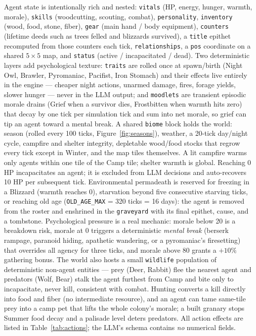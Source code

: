 \documentclass[10pt,a4paper]{article}
\begin{document}
Agent state is intentionally rich and nested: \texttt{vitals} (HP, energy, hunger, warmth, morale), \texttt{skills} (woodcutting, scouting, combat), \texttt{personality}, \texttt{inventory} (wood, food, stone, fiber), \texttt{gear} (main hand / body equipment), \texttt{counters} (lifetime deeds such as trees felled and blizzards survived), a \texttt{title} epithet recomputed from those counters each tick, \texttt{relationships}, a \texttt{pos} coordinate on a shared $5\times5$ map, and \texttt{status} (active / incapacitated / dead). Two deterministic layers add psychological texture: \texttt{traits} are rolled once at spawn/birth (Night Owl, Brawler, Pyromaniac, Pacifist, Iron Stomach) and their effects live entirely in the engine --- cheaper night actions, unarmed damage, fires, forage yields, slower hunger --- never in the LLM output; and \texttt{moodlets} are transient episodic morale drains (Grief when a survivor dies, Frostbitten when warmth hits zero) that decay by one tick per simulation tick and sum into net morale, so grief can tip an agent toward a mental break. A shared \texttt{biome} block holds the world: season (rolled every 100 ticks, Figure~\ref{fig:seasons}), weather, a 20-tick day/night cycle, campfire and shelter integrity, depletable wood/food stocks that regrow every tick except in Winter, and the map tiles themselves. A lit campfire warms only agents within one tile of the Camp tile; shelter warmth is global. Reaching 0 HP incapacitates an agent; it is excluded from LLM decisions and auto-recovers 10 HP per subsequent tick. Environmental permadeath is reserved for freezing in a Blizzard (warmth reaches 0), starvation beyond five consecutive starving ticks, or reaching old age (\texttt{OLD\_AGE\_MAX} = 320 ticks = 16 days): the agent is removed from the roster and enshrined in the \texttt{graveyard} with its final epithet, cause, and a tombstone. Psychological pressure is a real mechanic: morale below 20 is a breakdown risk, morale at 0 triggers a deterministic \emph{mental break} (berserk rampage, paranoid hiding, apathetic wandering, or a pyromaniac's firesetting) that overrides all agency for three ticks, and morale above 80 grants a $+10\%$ gathering bonus. The world also hosts a small \texttt{wildlife} population of deterministic non-agent entities --- prey (Deer, Rabbit) flee the nearest agent and predators (Wolf, Bear) stalk the agent furthest from Camp and bite only to incapacitate, never kill, consistent with combat. Hunting converts a kill directly into food and fiber (no intermediate resource), and an agent can tame same-tile prey into a camp pet that lifts the whole colony's morale; a built granary stops Summer food decay and a palisade level deters predators. All action effects are listed in Table~\ref{tab:actions}; the LLM's schema contains \emph{no} numerical fields.
\end{document}
